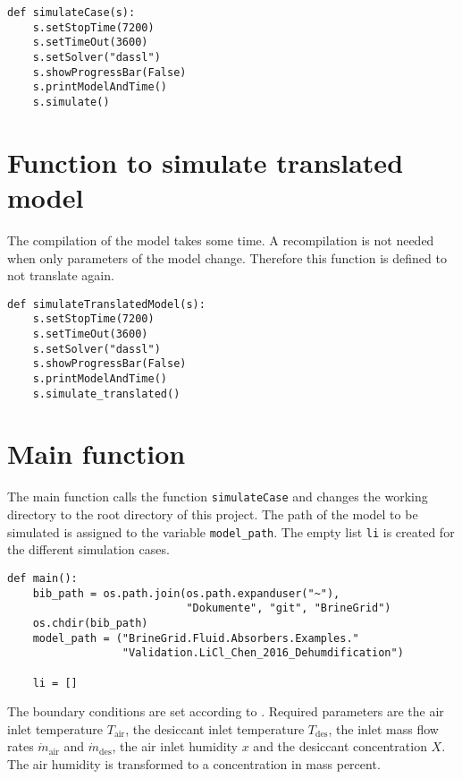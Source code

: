 \documentclass[article,a4paper,oneside,11pt,font=lmodern,language=english,titlepage=default,chapterstyle=article,pagestyle=default,bibliography=authoryear,theorem=colorbox,minted=true]{hri}
\begin{document}
\begin{verbatim}
def simulateCase(s):
    s.setStopTime(7200)
    s.setTimeOut(3600)
    s.setSolver("dassl")
    s.showProgressBar(False)
    s.printModelAndTime()
    s.simulate()

\end{verbatim}

\section{Function to simulate translated model}
\label{sec:orgb18aa86}

The compilation of the model takes some time. A recompilation is not needed
when only parameters of the model change. Therefore this function is defined to
not translate again.

\begin{verbatim}
def simulateTranslatedModel(s):
    s.setStopTime(7200)
    s.setTimeOut(3600)
    s.setSolver("dassl")
    s.showProgressBar(False)
    s.printModelAndTime()
    s.simulate_translated()

\end{verbatim}

\section{Main function}
\label{sec:org30d88de}

The main function calls the function \texttt{simulateCase} and changes the working
directory to the root directory of this project. The path of the model to be
simulated is assigned to the variable \texttt{model\_path}. The empty list \texttt{li} is
created for the different simulation cases.

\begin{verbatim}
def main():
    bib_path = os.path.join(os.path.expanduser("~"),
                            "Dokumente", "git", "BrineGrid")
    os.chdir(bib_path)
    model_path = ("BrineGrid.Fluid.Absorbers.Examples."
                  "Validation.LiCl_Chen_2016_Dehumdification")

    li = []
\end{verbatim}

\noindent The boundary conditions are set according to
\cite{chen-2016-exper-theor}. Required parameters are the air inlet temperature
\(T_{\mathrm{air}}\), the desiccant inlet temperature \(T_{\mathrm{des}}\), the
inlet mass flow rates \(\dot{m}_{\mathrm{air}}\) and \(\dot{m}_{\mathrm{des}}\),
the air inlet humidity \(x\) and the desiccant concentration \(X\). The air
humidity is transformed to a concentration in mass percent.
\end{document}
